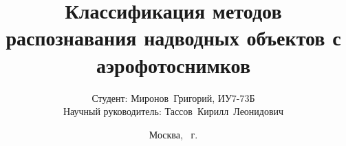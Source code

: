 \title{\LARGE Классификация методов распознавания надводных объектов с аэрофотоснимков}
\subtitle{\hfill Студент: Миронов~Григорий, ИУ7-73Б
 \\\hfill Научный руководитель: Тассов~Кирилл~Леонидович}
\date{Москва, \the\year{}~г.}

\frame {
	\titlepage
}

